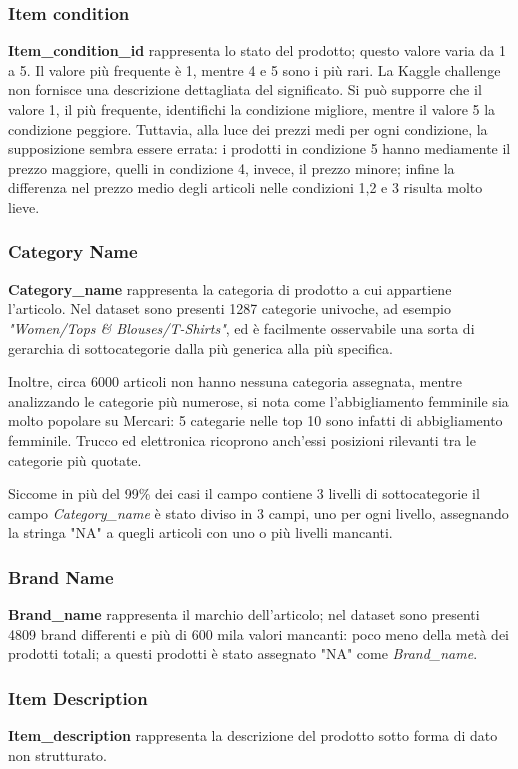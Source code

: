 
\subsubsection{Item condition}
\textbf{Item\_condition\_id} rappresenta lo stato del prodotto; questo valore
varia da 1 a 5. Il valore più frequente è 1, mentre 4 e 5 sono i più rari. La
Kaggle challenge non fornisce una descrizione dettagliata del significato. Si
può supporre che il valore 1, il più frequente, identifichi la condizione
migliore, mentre il valore 5 la condizione peggiore. Tuttavia, alla luce dei
prezzi medi per ogni condizione, la supposizione sembra essere errata: i
prodotti in condizione 5 hanno mediamente il prezzo maggiore, quelli in
condizione 4, invece, il prezzo minore; infine la differenza nel prezzo medio
degli articoli nelle condizioni 1,2 e 3 risulta molto lieve.
\subsubsection{Category Name}
\textbf{Category\_name} rappresenta la categoria di prodotto a cui appartiene l'articolo. Nel dataset
sono presenti 1287 categorie univoche, ad esempio \textit{"Women/Tops \&
Blouses/T-Shirts"}, ed è facilmente osservabile una sorta di gerarchia di
sottocategorie dalla più generica alla più specifica.

Inoltre, circa 6000 articoli non hanno nessuna categoria assegnata, mentre
analizzando le categorie più numerose, si nota come l'abbigliamento
femminile sia molto popolare su Mercari: 5 categarie nelle top 10 sono infatti
di abbigliamento femminile. Trucco ed elettronica ricoprono anch'essi posizioni
rilevanti tra le categorie più quotate.

Siccome in più del 99\% dei casi il campo contiene 3 livelli di sottocategorie
il campo \textit{Category\_name} è stato diviso in 3 campi, uno per ogni livello,
assegnando la stringa "NA" a quegli articoli con uno o più livelli mancanti.
\subsubsection{Brand Name}
\textbf{Brand\_name} rappresenta il marchio dell'articolo; nel dataset sono
presenti 4809 brand differenti e più di 600 mila valori mancanti: poco meno
della metà dei prodotti totali; a questi prodotti è stato assegnato "NA" come \textit{Brand\_name}.
\subsubsection{Item Description}
\textbf{Item\_description} rappresenta la descrizione del prodotto sotto forma
di dato non strutturato.

